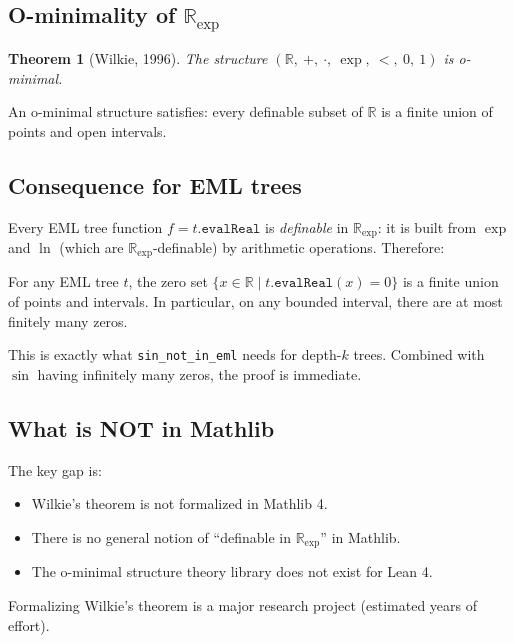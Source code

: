 \documentclass[12pt]{article}
\newtheorem{theorem}{Theorem}
\begin{document}
\subsection{O-minimality of $\mathbb{R}_{\exp}$}

\begin{theorem}[Wilkie, 1996]
The structure $(\mathbb{R},\ +,\ \cdot,\ \exp,\ <,\ 0,\ 1)$ is o-minimal.
\end{theorem}

An o-minimal structure satisfies: every definable subset of $\mathbb{R}$ is a
finite union of points and open intervals.

\subsection{Consequence for EML trees}

Every EML tree function $f = t.\mathtt{evalReal}$ is \emph{definable} in
$\mathbb{R}_{\exp}$: it is built from $\exp$ and $\ln$ (which are $\mathbb{R}_{\exp}$-definable)
by arithmetic operations. Therefore:

\begin{corollary}
For any EML tree $t$, the zero set $\{x \in \mathbb{R} \mid t.\mathtt{evalReal}(x) = 0\}$
is a finite union of points and intervals. In particular, on any bounded interval,
there are at most finitely many zeros.
\end{corollary}

This is exactly what \texttt{sin\_not\_in\_eml} needs for depth-$k$ trees.
Combined with $\sin$ having infinitely many zeros, the proof is immediate.

\subsection{What is NOT in Mathlib}

The key gap is:
\begin{itemize}[noitemsep]
  \item Wilkie's theorem is not formalized in Mathlib 4.
  \item There is no general notion of ``definable in $\mathbb{R}_{\exp}$'' in Mathlib.
  \item The o-minimal structure theory library does not exist for Lean 4.
\end{itemize}

Formalizing Wilkie's theorem is a major research project (estimated years of effort).

\end{document}
